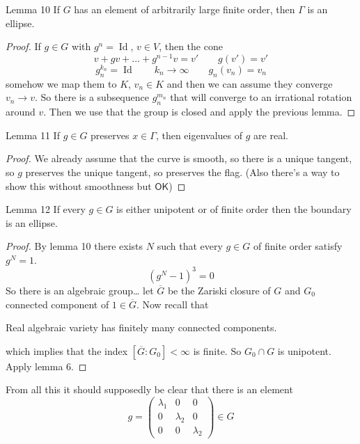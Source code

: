 \begin{thing2}{Lemma 10}\leavevmode
	If $G$ has an element of arbitrarily large finite order, then $\Gamma$ is an ellipse.
\end{thing2}

\begin{proof}\leavevmode
	If $g \in G$ with $g^n=\operatorname{Id}$,  $v \in V$, then the cone
	\[v+gv+\ldots +g^{n-1}v=v'\qquad g(v')=v'\]
\[g^{k_n}_n=\operatorname{Id}\qquad k_n\to \infty\qquad g_n(v_n)=v_n\]
somehow we map them to $K$, $v_n\in K$ and then we can assume they converge $v_n\to v$. So there is a subsequence $g_n^{m_n}$ that will converge to an irrational rotation around $v$. Then we use that the group is closed and apply the previous lemma.
\end{proof}

\begin{thing6}{Lemma 11}\leavevmode
	If $g \in G$ preserves $ x\in \Gamma$, then eigenvalues of $ g$ are real.
\end{thing6}

\begin{proof}\leavevmode
	We already assume that the curve is smooth, so there is a unique tangent, so $g$ preserves the unique tangent, so preserves the flag. (Also there's a way to show this without smoothness but $\mathsf{OK}$)
\end{proof}

\begin{thing4}{Lemma 12}\leavevmode
	If every $g \in G$ is either unipotent or of finite order then the boundary is an ellipse.
\end{thing4}

\begin{proof}\leavevmode
	By lemma 10 there exists $N$ such that every $g\in G$ of finite order satisfy $g^N=1$.
\[(g^N-1)^3=0\]
	So there is an algebraic group… let $\overline{G}$ be the Zariski closure of $G$ and $G_0$ connected component of $1\in \overline{G}$. Now recall that

	\begin{thm}\leavevmode
		Real algebraic variety has finitely many connected components.
	\end{thm}
	which implies that the index $[\overline{G}:G_0]<\infty$ is finite. So $G_0\cap G$ is unipotent. Apply lemma 6.
\end{proof}

From all this it should supposedly be clear that there is an element
\[g=\begin{pmatrix} \lambda_1 & 0 & 0\\0 & \lambda_2 & 0\\0 & 0 & \lambda_2 \end{pmatrix} \in G\]


